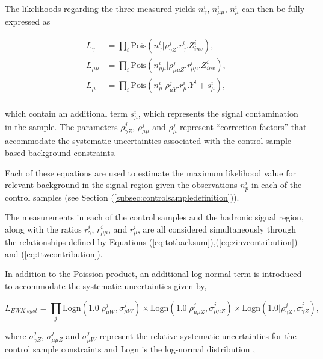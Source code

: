 The likelihoods regarding the three measured yields $n^{i}_{\gamma}$, $n^{i}_{\mu\mu}$, $n^{i}_{\mu}$ can then be fully expressed as

\begin{align}
L_{\gamma} &= \prod_{i} \text{Pois} (n^{i}_{\gamma} | \rho^{j}_{\gamma Z} . r^{i}_{\gamma} . Z^{i}_{inv}), \\
L_{\mu\mu} &= \prod_{i} \text{Pois} (n^{i}_{\mu\mu} | \rho^{j}_{\mu\mu Z} . r^{i}_{\mu\mu} . Z^{i}_{inv}), \\
L_{\mu} &= \prod_{i} \text{Pois} (n^{i}_{\mu} | \rho^{j}_{\mu Y} . r^{i}_{\mu} . Y^{i} + s^{i}_{\mu}), \\
\end{align}

which contain an additional term $s^{i}_{\mu}$, which represents the signal contamination in the \mupjets sample. The parameters $\rho^{j}_{\gamma Z}$, $\rho^{j}_{\mu\mu}$ and $\rho^{j}_{\mu}$ represent ``correction factors'' that accommodate the systematic uncertainties associated with the control sample based background constraints. 

Each of these equations are used to estimate the maximum likelihood value for relevant background in the signal region given the observations $n^{i}_{p}$ in each of the control samples (see Section (\ref{subsec:controlsampledefinition})).

The measurements in each of the control samples and the hadronic signal region, along with the ratios $r^{i}_{\gamma}$, $r^{i}_{\mu\mu}$, and $r^{i}_{\mu}$, are all considered simultaneously through the relationships defined by Equations (\ref{eq:totbacksum}),(\ref{eq:zinvcontribution}) and (\ref{eq:ttwcontribution}).

In addition to the Poission product, an additional log-normal term is introduced to accommodate the systematic uncertainties given by,

\begin{equation}
L_{EWK\ syst} = \prod_{j} \text{Logn}(1.0|\rho^{j}_{\mu W},\sigma^{j}_{\mu W} ) \times \text{Logn}(1.0|\rho^{j}_{\mu\mu Z},\sigma^{j}_{\mu\mu Z} ) \times \text{Logn}(1.0|\rho^{j}_{\gamma Z},\sigma^{j}_{\gamma Z} ), 
\end{equation}

where $\sigma^{j}_{\gamma Z}$, $\sigma^{j}_{\mu\mu Z}$ and $\sigma^{j}_{\mu W}$ represent the relative systematic uncertainties for the control sample constraints and Logn is the log-normal distribution \cite{logndistribution},


